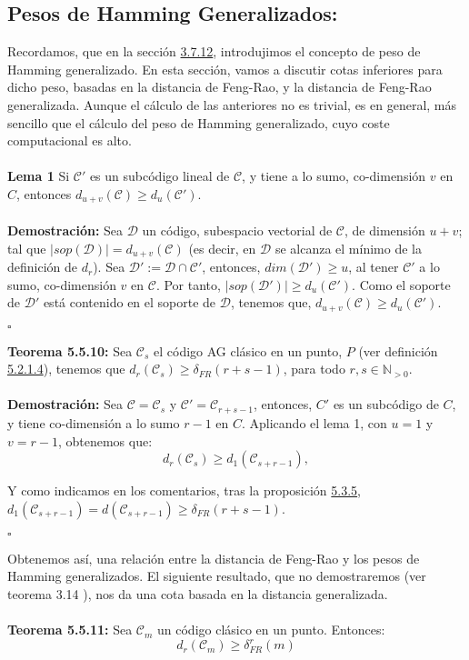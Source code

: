 \documentclass[11pt,spanish]{book}
\newcommand{\qed}{\begin{flushright} $\square$ \end{flushright}}
\newcommand{\FR}[2]{\delta_{FR}^{#1}(#2)}
\begin{document}
\subsection*{Pesos de Hamming Generalizados:}
Recordamos, que en la sección \hyperlink{def3.7.12}{3.7.12}, introdujimos el concepto de peso de Hamming generalizado. En esta sección, vamos a discutir cotas inferiores para dicho peso, basadas en la distancia de Feng-Rao, y la distancia de Feng-Rao generalizada. Aunque el cálculo de las anteriores no es trivial, es en general, más sencillo que el cálculo del peso de Hamming generalizado, cuyo coste computacional es alto.\\
\\ \textbf{Lema 1} Si $\mathcal{C}'$ es un subcódigo lineal de $\mathcal{C}$, y tiene a lo sumo, co-dimensión $v$ en $C$, entonces $d_{u+v}(\mathcal{C})\geq d_{u}(\mathcal{C}')$.\\
\\ \textbf{Demostración:}
Sea $\mathcal{D}$ un código, subespacio vectorial de $\mathcal{C}$, de dimensión $u+v$; tal que $|sop(\mathcal{D})|=d_{u+v}(\mathcal{C})$ (es decir, en $\mathcal{D}$ se alcanza el mínimo de la definición de $d_r$). 
Sea $\mathcal{D}':=\mathcal{D}\cap \mathcal{C}'$, entonces, $dim(\mathcal{D}')\geq u$, al tener $\mathcal{C}'$ a lo sumo, co-dimensión $v$ en $\mathcal{C}$. Por tanto, $|sop(\mathcal{D}')|\geq d_u(\mathcal{C}')$. Como el soporte de $\mathcal{D}'$ está contenido en el soporte de $\mathcal{D}$, tenemos que, $d_{u+v}(\mathcal{C})\geq d_u(\mathcal{C}')$.
\qed
\textbf{Teorema 5.5.10:} Sea $\mathcal{C}_s$ el código AG clásico en un punto, $P$ (ver definición \hyperlink{def5.3.1.7}{5.2.1.4}), tenemos que $d_r(\mathcal{C}_s)\geq \delta_{FR}(r+s-1)$, para todo $r,s\in\mathbb{N}_{> 0}$.\\
\\\textbf{Demostración:}
Sea $\mathcal{C}=\mathcal{C}_s$ y $\mathcal{C}'=\mathcal{C}_{r+s-1}$, entonces, $C'$ es un subcódigo de $C$, y tiene co-dimensión a lo sumo $r-1$ en $C$. Aplicando el lema 1, con $u=1$ y $v=r-1$, obtenemos que:
$$d_r(\mathcal{C}_s)\geq d_1(\mathcal{C}_{s+r-1}),$$

Y como indicamos en los comentarios, tras la proposición \hyperlink{prop5.4.6}{5.3.5}, $d_1(\mathcal{C}_{s+r-1})=d(\mathcal{C}_{s+r-1})\geq \delta_{FR}(r+s-1)$.
\qed

Obtenemos así, una relación entre la distancia de Feng-Rao y los pesos de Hamming generalizados. El siguiente resultado, que no demostraremos (ver teorema 3.14 \cite{original}), nos da una cota basada en la distancia generalizada.\\
\\\textbf{Teorema 5.5.11:} Sea $\mathcal{C}_m$ un código clásico en un punto. Entonces:
$$d_r(\mathcal{C}_m)\geq\FR{r}{m}$$
\newpage 
\printbibliography
{}
\cite{García-Sánchez1}
\cite{García-Sánchez2}
\cite{García-Sánchez-Oporto}
\cite{Bras-Amorós1}
\cite{Bras-Amorós2}
\cite{Tom-Høholdt}
\cite{Munuera}
\cite{Commutative-Albegra}
\cite{Bras-Amorós3}
\cite{Munuera-Hamming}
\cite{Kirfel}
\cite{J.I.Farrán}
\cite{FULTRON}
\cite{Wire-tap}
\cite{wei}
\cite{original}
\end{document}
